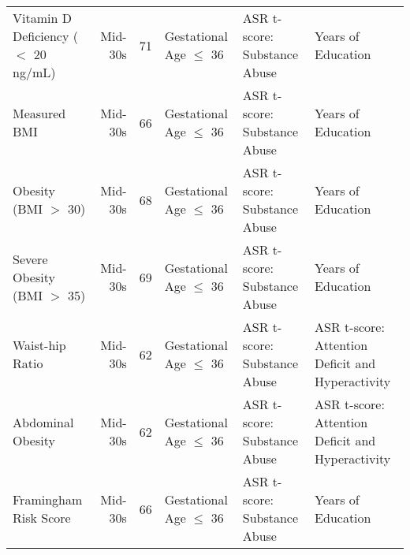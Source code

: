 \begin{tabular}{l r r l l l}
Vitamin D Deficiency ($<$ 20 ng/mL)	&	Mid-30s	&	71	&	Gestational Age $\leq$ 36	&	ASR t-score: Substance Abuse	&	Years of Education	\\
Measured BMI	&	Mid-30s	&	66	&	Gestational Age $\leq$ 36	&	ASR t-score: Substance Abuse	&	Years of Education	\\
Obesity (BMI $>$ 30)	&	Mid-30s	&	68	&	Gestational Age $\leq$ 36	&	ASR t-score: Substance Abuse	&	Years of Education	\\
Severe Obesity (BMI $>$ 35)	&	Mid-30s	&	69	&	Gestational Age $\leq$ 36	&	ASR t-score: Substance Abuse	&	Years of Education	\\
Waist-hip Ratio	&	Mid-30s	&	62	&	Gestational Age $\leq$ 36	&	ASR t-score: Substance Abuse	&	ASR t-score: Attention Deficit and Hyperactivity	\\
Abdominal Obesity	&	Mid-30s	&	62	&	Gestational Age $\leq$ 36	&	ASR t-score: Substance Abuse	&	ASR t-score: Attention Deficit and Hyperactivity	\\
Framingham Risk Score	&	Mid-30s	&	66	&	Gestational Age $\leq$ 36	&	ASR t-score: Substance Abuse	&	Years of Education	\\
\bottomrule											
\end{tabular}